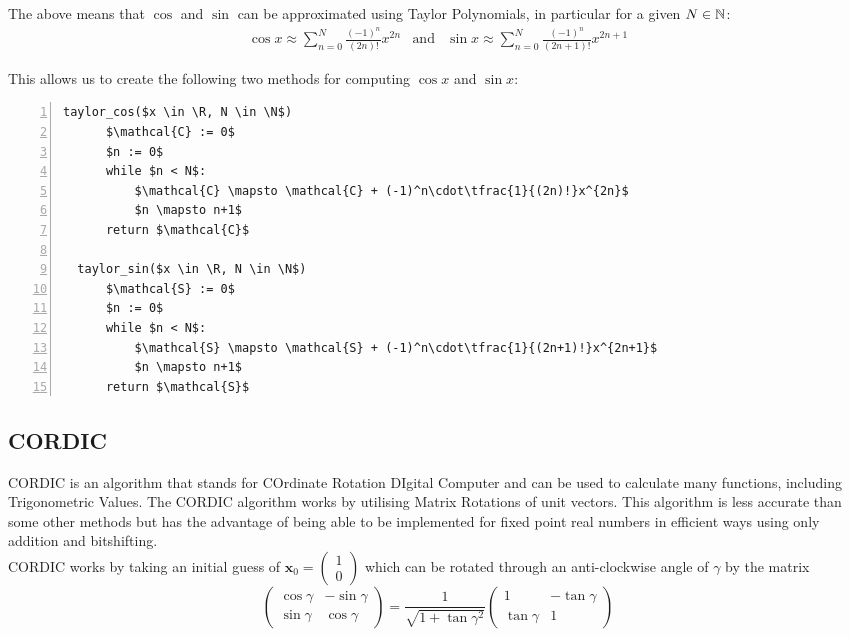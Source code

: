 {The above means that \(\cos\) and \(\sin\) can be approximated using Taylor Polynomials, in particular for a given \(N \in \mathbb{N}\):
\begin{displaymath}
\begin{array}{rcl}
	\cos x \approx \sum_{n=0}^N \frac{(-1)^n}{(2n)!}x^{2n}
	& \textrm{and}
	&\sin x\approx \sum_{n=0}^N \frac{(-1)^n}{(2n+1)!}x^{2n+1}
\end{array}
\end{displaymath}

This allows us to create the following two methods for computing \(\cos x\) and \(\sin x\):

\begin{lstlisting}[numbers=left,frame=single,mathescape,caption={Taylor computation of \(\cos\) and \(\sin\)},label={PCD_"Taylor Cos/Sin"}]
  taylor_cos($x \in \R, N \in \N$)
      $\mathcal{C} := 0$
      $n := 0$
      while $n < N$:
          $\mathcal{C} \mapsto \mathcal{C} + (-1)^n\cdot\tfrac{1}{(2n)!}x^{2n}$
          $n \mapsto n+1$
      return $\mathcal{C}$
  
  taylor_sin($x \in \R, N \in \N$)
      $\mathcal{S} := 0$
      $n := 0$
      while $n < N$:
          $\mathcal{S} \mapsto \mathcal{S} + (-1)^n\cdot\tfrac{1}{(2n+1)!}x^{2n+1}$
          $n \mapsto n+1$
      return $\mathcal{S}$
\end{lstlisting}


\subsection{CORDIC}
CORDIC is an algorithm that stands for COrdinate Rotation DIgital Computer and can be used to calculate many functions, including Trigonometric Values. The CORDIC algorithm works by utilising Matrix Rotations of unit vectors. This algorithm is less accurate than some other methods but has the advantage of being able to be implemented for fixed point real numbers in efficient ways using only addition and bitshifting.\\

CORDIC works by taking an initial guess of
\begin{math}
	\mathbf{x}_0 = \left( 
		\begin{array}{c}
			1 \\
			0
		\end{array} \right)
\end{math}
which can be rotated through an anti-clockwise angle of $\gamma$ by the matrix
\begin{displaymath}
	\left( \begin{array}{cc}
		\cos{\gamma} & -\sin{\gamma} \\
		\sin{\gamma} &  \cos{\gamma}
	\end{array} \right)
	= \frac{1}{\sqrt{1 + \tan{\gamma}^2}} \left( \begin{array}{cc}
		1 & -\tan{\gamma} \\
		\tan{\gamma} & 1
	\end{array} \right)
\end{displaymath}

}
